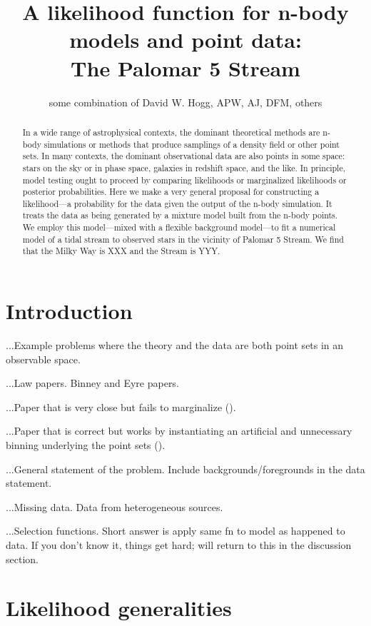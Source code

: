 \documentclass[12pt,pdftex,preprint]{aastex}
\begin{document}
\title{A likelihood function for n-body models and point data:\\
       The Palomar 5 Stream}
\author{some combination of David W. Hogg, APW, AJ, DFM, others}

\begin{abstract}
In a wide range of astrophysical contexts, the dominant theoretical
methods are n-body simulations or methods that produce samplings of a
density field or other point sets.  In many contexts, the dominant
observational data are also points in some space: stars on the sky or
in phase space, galaxies in redshift space, and the like.  In
principle, model testing ought to proceed by comparing likelihoods or
marginalized likelihoods or posterior probabilities.  Here we make a
very general proposal for constructing a likelihood---a probability
for the data given the output of the n-body simulation.  It treats the
data as being generated by a mixture model built from the n-body
points.  We employ this model---mixed with a flexible background
model---to fit a numerical model of a tidal stream to observed stars
in the vicinity of Palomar 5 Stream.  We find that the Milky Way is
XXX and the Stream is YYY.
\end{abstract}

\section{Introduction}

...Example problems where the theory and the data are both point sets in
an observable space.

...Law papers.  Binney and Eyre papers.

...Paper that is very close but fails to marginalize
(\citealt{varghese}).

...Paper that is correct but works by instantiating an artificial and
unnecessary binning underlying the point sets (\citealt{saha}).

...General statement of the problem.  Include backgrounds/foregrounds
in the data statement.

...Missing data.  Data from heterogeneous sources.

...Selection functions.  Short answer is apply same fn to model as
happened to data.  If you don't know it, things get hard; will return
to this in the discussion section.

\section{Likelihood generalities}
\end{document}
